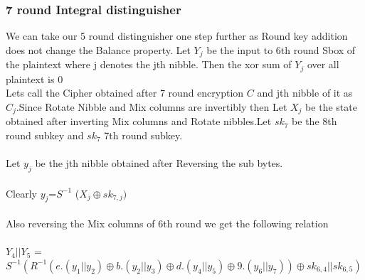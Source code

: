 \documentclass[preprint]{transcrypto}
\begin{document}
\subsubsection{7 round Integral distinguisher}

We can take our 5 round distinguisher one step further as Round key addition does not change the Balance property. Let $Y_{j}$ be the input to 6th round Sbox of the  plaintext where j denotes the jth nibble. Then the xor sum of $Y_{j}$ over all plaintext is 0 \\

Lets call the Cipher obtained after 7 round encryption $C$ and jth nibble of it as  $C_{j}$.Since Rotate Nibble and Mix columns are invertibly then Let $X_{j}$ be the state obtained after inverting Mix columns and Rotate nibbles.Let $sk_{7}$ be the 8th round subkey and $sk_{7}$ 7th round subkey. \\
\\
Let $y_{j}$ be the jth nibble obtained after Reversing the sub bytes.\\ \\ Clearly $y_{j}$=$S^{-1}$ ($X_{j}\oplus sk_{7,j}) $ 
\\ \\
Also reversing the Mix columns of 6th round we get the following relation \\ \\
	$Y_{4}||Y_{5}$ = $S^{-1}(R^{-1}(e.(y_{1}||y_{2})\oplus b.(y_{2}||y_{3})\oplus d.(y_{4}||y_{5})\oplus9.(y_{6}|| y_{7}))
	\oplus sk_{6,4} || sk_{6,5})$
\\ \\
\end{document}
